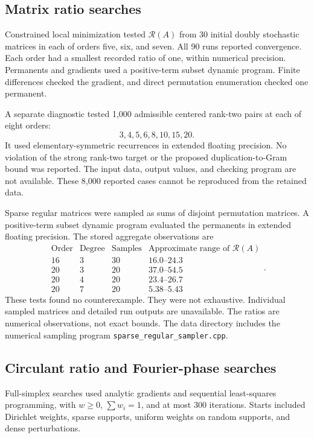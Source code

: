 \subsection{Matrix ratio searches}\label{app:finite-3}

Constrained local minimization tested \(\mathcal R(A)\) from 30 initial doubly stochastic matrices in each of orders five, six, and seven. All 90 runs reported convergence. Each order had a smallest recorded ratio of one, within numerical precision. Permanents and gradients used a positive-term subset dynamic program. Finite differences checked the gradient, and direct permutation enumeration checked one permanent.

A separate diagnostic tested 1,000 admissible centered rank-two pairs at each of eight orders:
\[
3,4,5,6,8,10,15,20.
\]
It used elementary-symmetric recurrences in extended floating precision. No violation of the strong rank-two target or the proposed duplication-to-Gram bound was reported. The input data, output values, and checking program are not available. These 8,000 reported cases cannot be reproduced from the retained data.

Sparse regular matrices were sampled as sums of disjoint permutation matrices. A positive-term subset dynamic program evaluated the permanents in extended floating precision. The stored aggregate observations are
\[
\begin{array}{c|c|c|c}
\text{Order}&\text{Degree}&\text{Samples}&\text{Approximate range of }\mathcal R(A)\\\hline
16&3&30&16.0\text{--}24.3\\
20&3&20&37.0\text{--}54.5\\
20&4&20&23.4\text{--}26.7\\
20&7&20&5.38\text{--}5.43
\end{array}.
\]
These tests found no counterexample. They were not exhaustive. Individual sampled matrices and detailed run outputs are unavailable. The ratios are numerical observations, not exact bounds. The data directory includes the numerical sampling program \texttt{sparse\_regular\_sampler.cpp}.

\subsection{Circulant ratio and Fourier-phase searches}\label{app:finite-4}

Full-simplex searches used analytic gradients and sequential least-squares programming, with \(w\ge0\), \(\sum w_i=1\), and at most 300 iterations. Starts included Dirichlet weights, sparse supports, uniform weights on random supports, and dense perturbations.

